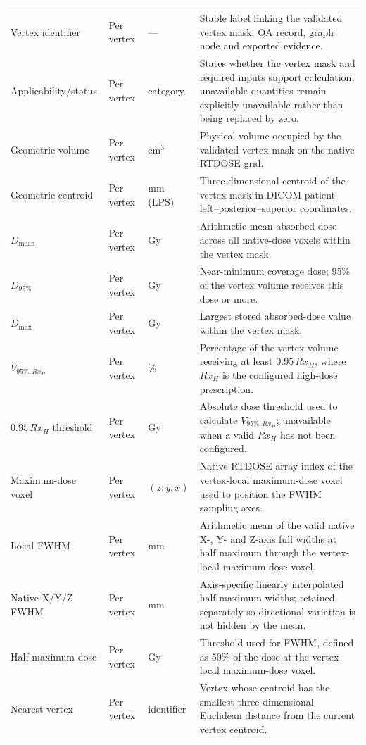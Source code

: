 {\begin{longtable}{
  >{\raggedright\arraybackslash}p{3.0cm}
  >{\centering\arraybackslash}p{1.25cm}
  >{\centering\arraybackslash}p{1.45cm}
  >{\raggedright\arraybackslash}p{9.45cm}}
\multicolumn{4}{l}{\textbf{Primary vertex dose and geometry QA}}\\*
\addlinespace[2pt]
Vertex identifier & Per vertex & --- & Stable label linking the validated vertex mask, QA record, graph node and exported evidence. \\
Applicability/status & Per vertex & category & States whether the vertex mask and required inputs support calculation; unavailable quantities remain explicitly unavailable rather than being replaced by zero. \\
Geometric volume & Per vertex & cm$^{3}$ & Physical volume occupied by the validated vertex mask on the native RTDOSE grid. \\
Geometric centroid & Per vertex & mm (LPS) & Three-dimensional centroid of the vertex mask in DICOM patient left--posterior--superior coordinates. \\
$D_{\mathrm{mean}}$ & Per vertex & Gy & Arithmetic mean absorbed dose across all native-dose voxels within the vertex mask. \\
$D_{95\%}$ & Per vertex & Gy & Near-minimum coverage dose; 95\% of the vertex volume receives this dose or more. \\
$D_{\max}$ & Per vertex & Gy & Largest stored absorbed-dose value within the vertex mask. \\
$V_{95\%,Rx_H}$ & Per vertex & \% & Percentage of the vertex volume receiving at least $0.95\,Rx_H$, where $Rx_H$ is the configured high-dose prescription. \\
$0.95\,Rx_H$ threshold & Per vertex & Gy & Absolute dose threshold used to calculate $V_{95\%,Rx_H}$; unavailable when a valid $Rx_H$ has not been configured. \\
Maximum-dose voxel & Per vertex & $(z,y,x)$ & Native RTDOSE array index of the vertex-local maximum-dose voxel used to position the FWHM sampling axes. \\
Local FWHM & Per vertex & mm & Arithmetic mean of the valid native X-, Y- and Z-axis full widths at half maximum through the vertex-local maximum-dose voxel. \\
Native X/Y/Z FWHM & Per vertex & mm & Axis-specific linearly interpolated half-maximum widths; retained separately so directional variation is not hidden by the mean. \\
Half-maximum dose & Per vertex & Gy & Threshold used for FWHM, defined as 50\% of the dose at the vertex-local maximum-dose voxel. \\
Nearest vertex & Per vertex & identifier & Vertex whose centroid has the smallest three-dimensional Euclidean distance from the current vertex centroid. \\

\end{longtable}}
